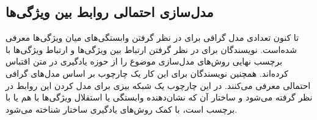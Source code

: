 \subsection{مدل‌سازی احتمالی روابط بین ویژگی‌ها}
تا کنون تعدادی مدل گرافی برای در نظر گرفتن وابستگی‌های میان ویژگی‌ها معرفی شده‌است. نویسندگان \cite{topicmodel} برای در نظر گرفتن ارتباط بین ویژگی‌ها و ارتباط ویژگی‌ها با برچسب نهایی روش‌های مدل‌سازی موضوع  را از حوزه یادگیری در متن اقتباس کرده‌اند. همچنین  نویسندگان \cite{unified13} برای این کار یک چارچوب بر اساس مدل‌های گرافی احتمالی معرفی می‌کنند. در این چارچوب یک شبکه بیزی  برای مدل کردن این روابط در نظر گرفته می‌شود و ساختار آن که نشان‌دهنده وابستگی یا استقلال ویژگی‌ها با هم یا با برچسب است، با کمک روش‌های یادگیری ساختار
شناخته می‌شود.

